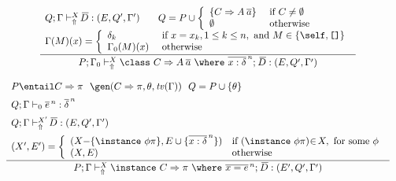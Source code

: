 \begin{figure}
\begin{mdframed}
\[ \begin{array}{cc}
	\displaystyle\frac
	 {\begin{array}{ll}
            Q;\Gamma \vdash_{\Uparrow}^X \overline{\!D} : (E, Q', \Gamma') \:\: & \:\:
            Q = P \cup \left\{ \begin{array}{ll}
                                  \{ C \Rightarrow A\:\overline{a} \} & \text{ if } C \not= \emptyset \\
                                  \emptyset                              & \text{ otherwise}
                                \end{array}\right. \\
            \multicolumn{2}{c}{
                \Gamma(M)(x) = \left\{ \begin{array}{ll}
                                 \delta_k       & \text{ if } x = x_k, 1 \leq k \leq n, \text{ and } 
                                                              M \in \{ \self, \texttt{[]} \}\\
                                 \Gamma_0(M)(x) & \text{ otherwise} 
                               \end{array}\right. }
          \end{array}}
	 {P;\Gamma_0 \vdash_{\Uparrow}^X \class\ C \Rightarrow A\: \overline{a}\ \where\ \overline{x:\delta}^{\,n};\: \overline{\!D} : 
            (E, Q', \Gamma') } \\\ \\

	\displaystyle\frac
	 {\begin{array}{l}
               P \entail C \Rightarrow \pi \:\:\:
               \gen(C\Rightarrow \pi, \theta, \tv(\Gamma)) \:\:\:
               Q = P \cup \{ \theta \} \:\:\: \\[.2cm]
               Q;\Gamma \vdash_0 \overline{e}^{\,n} : \overline{\delta}^{\,n} \:\:\:\\[.2cm]
               Q;\Gamma \vdash_{\Uparrow}^{X'} \overline{\!D} : (E,Q',\Gamma') \\[.2cm]
               (X',E') = \left\{ \begin{array}{ll}
                               (X\hspace*{-.08cm} -\hspace*{-.08cm} \{ \instance\ \phi\pi \}, E \cup \{ \overline{x : \delta}^{\,n} \}) 
                                   & \text{if } (\instance\ \phi\pi)\hspace*{-.08cm} \in\hspace*{-.05cm} X, \text{ for some } \phi\\
                               (X, E) & \text{otherwise} 
                             \end{array}\right.
          \end{array}}
	 {P;\Gamma \vdash_{\Uparrow}^X \instance\ C \Rightarrow \pi\ \where\ \overline{x = e}^{\,n};\: \overline{\!D}
             : (E',Q',\Gamma')}\\\ \\


\end{array}\]
\end{mdframed}
\end{figure}
